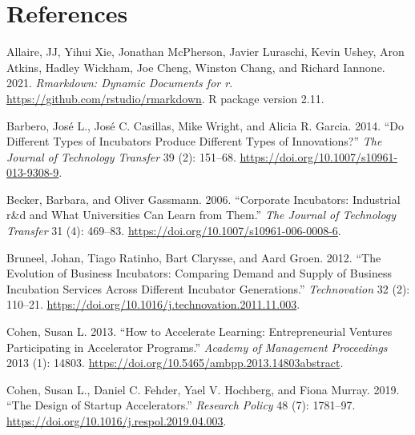 \documentclass[
  12pt,
]{article}
\newlength{\cslhangindent}
\newlength{\cslentryspacingunit} %
\newenvironment{CSLReferences}[2] %
 {%
  \setlength{\parindent}{0pt}
  \ifodd #1
  \let\oldpar\par
  \def\par{\hangindent=\cslhangindent\oldpar}
  \fi
  \setlength{\parskip}{#2\cslentryspacingunit}
 }%
 {}
\begin{document}

\clearpage

\hypertarget{references}{%
\section*{References}\label{references}}

\hypertarget{refs}{}
\begin{CSLReferences}{1}{0}
\leavevmode{}%
Allaire, JJ, Yihui Xie, Jonathan McPherson, Javier Luraschi, Kevin Ushey, Aron Atkins, Hadley Wickham, Joe Cheng, Winston Chang, and Richard Iannone. 2021. \emph{Rmarkdown: Dynamic Documents for r}. \url{https://github.com/rstudio/rmarkdown}. R package version 2.11.

\leavevmode{}%
Barbero, José L., José C. Casillas, Mike Wright, and Alicia R. Garcia. 2014. {``Do Different Types of Incubators Produce Different Types of Innovations?''} \emph{The Journal of Technology Transfer} 39 (2): 151--68. \url{https://doi.org/10.1007/s10961-013-9308-9}.

\leavevmode{}%
Becker, Barbara, and Oliver Gassmann. 2006. {``Corporate Incubators: Industrial r\&d and What Universities Can Learn from Them.''} \emph{The Journal of Technology Transfer} 31 (4): 469--83. \url{https://doi.org/10.1007/s10961-006-0008-6}.

\leavevmode{}%
Bruneel, Johan, Tiago Ratinho, Bart Clarysse, and Aard Groen. 2012. {``The Evolution of Business Incubators: Comparing Demand and Supply of Business Incubation Services Across Different Incubator Generations.''} \emph{Technovation} 32 (2): 110--21. \url{https://doi.org/10.1016/j.technovation.2011.11.003}.

\leavevmode{}%
Cohen, Susan L. 2013. {``How to Accelerate Learning: Entrepreneurial Ventures Participating in Accelerator Programs.''} \emph{Academy of Management Proceedings} 2013 (1): 14803. \url{https://doi.org/10.5465/ambpp.2013.14803abstract}.

\leavevmode{}%
Cohen, Susan L., Daniel C. Fehder, Yael V. Hochberg, and Fiona Murray. 2019. {``The Design of Startup Accelerators.''} \emph{Research Policy} 48 (7): 1781--97. \url{https://doi.org/10.1016/j.respol.2019.04.003}.


\end{CSLReferences}
\end{document}
